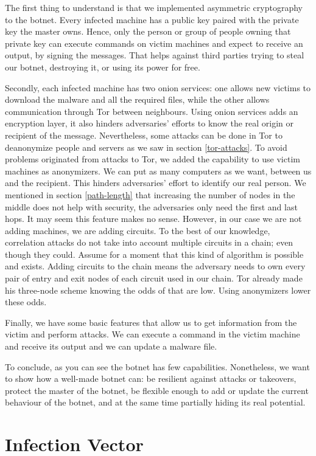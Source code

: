 \documentclass[11pt, a4paper,twoside]{tesi_upf}
\begin{document}
The first thing to understand is that we implemented asymmetric cryptography to the botnet. Every infected machine has a public key paired with the private key the master owns. Hence, only the person or group of people owning that private key can execute commands on victim machines and expect to receive an output, by signing the messages. That helps against third parties trying to steal our botnet, destroying it, or using its power for free.

Secondly, each infected machine has two onion services: one allows new victims to download the malware and all the required files, while the other allows communication through Tor between neighbours. Using onion services adds an encryption layer, it also hinders adversaries' efforts to know the real origin or recipient of the message. Nevertheless, some attacks can be done in Tor to deanonymize people and servers as we saw in section \ref{tor-attacks}. To avoid problems originated from attacks to Tor, we added the capability to use victim machines as anonymizers. We can put as many computers as we want, between us and the recipient. This hinders adversaries' effort to identify our real person. We mentioned in section \ref{path-length} that increasing the number of nodes in the middle does not help with security, the adversaries only need the first and last hops. It may seem this feature makes no sense. However, in our case we are not adding machines, we are adding circuits. To the best of our knowledge, correlation attacks do not take into account multiple circuits in a chain; even though they could. Assume for a moment that this kind of algorithm is possible and exists. Adding circuits to the chain means the adversary needs to own every pair of entry and exit nodes of each circuit used in our chain. Tor already made his three-node scheme knowing the odds of that are low. Using anonymizers lower these odds.

Finally, we have some basic features that allow us to get information from the victim and perform attacks. We can execute a command in the victim machine and receive its output and we can update a malware file.

To conclude, as you can see the botnet has few capabilities. Nonetheless, we want to show how a well-made botnet can: be resilient against attacks or takeovers, protect the master of the botnet, be flexible enough to add or update the current behaviour of the botnet, and at the same time partially hiding its real potential.

\section{Infection Vector}
\end{document}
